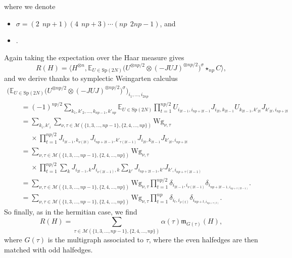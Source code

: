 \documentclass[pdftex]{sigma}
\numberwithin{equation}{section}
\theoremstyle{definition}
\begin{document}
\noindent
where we denote{\samepage
\begin{itemize}\itemsep=0pt
    \item $\sigma = (2 \ \ np+1)(4 \ \ np+3)\cdots (np \ \ 2np-1)$, and
    \item {}.
\end{itemize}}%
Again taking the expectation over the Haar measure gives
\[ R(H) = \big\langle H^{\otimes n}, \mathbb{E}_{U \in \mathrm{Sp}(2N)} \bigl(U^{\otimes np/2} \otimes (-JUJ)^{\otimes np/2}\bigr)^{\sigma} \star_{np} C \big\rangle, \]
and we derive thanks to symplectic Weingarten calculus \cite{collinssniady04}
\begin{gather*}
    \bigl( \mathbb{E}_{U \in \mathrm{Sp}(2N)} \bigl(U^{\otimes np/2} \otimes (-JUJ)^{\otimes np/2}\bigr)^{\sigma}\bigr)_{i_1,\dots,i_{2np}} \\
    \qquad= (-1)^{np/2} \sum_{k_1,k'_2,\dots,k_{np-1},k'_{np}} \mathbb{E}_{U \in \mathrm{Sp}(2N)}\prod_{t=1}^{np/2} U_{i_{2t-1},i_{np+2t-1}} J_{i_{2t},k_{2t-1}} U_{k_{2t-1},k'_{2t}} J_{k'_{2t},i_{np+2t}}\\
    \qquad= \sum_{k_i,k'_i} \sum_{\nu,\tau \in \mathcal{M}(\{1,3,\dots,np-1\}, \{2,4,\dots,np\})} \mathrm{Wg}_{\nu,\tau}\\
     \phantom{\qquad= }{}\times\prod_{t=1}^{np/2} J_{i_{2t-1},k_{\nu(2t)}} J_{i_{np+2t-1},k'_{\tau(2t-1)}} J_{i_{2t},k_{2t-1}} J_{k'_{2t},i_{np+2t}} \\
    \qquad= \sum_{\nu,\tau \in \mathcal{M}(\{1,3,\dots,np-1\}, \{2,4,\dots,np\})} \mathrm{Wg}_{\nu,\tau}\\
     \phantom{\qquad= }{}\times\prod_{t=1}^{np/2} \sum_{k} J_{i_{2t-1},k}  J_{i_{\nu(2t-1)},k} \sum_{k'} J_{i_{np+2t-1},k'} J_{k',i_{np+\tau(2t-1)}} \\
    \qquad= \sum_{\nu,\tau \in \mathcal{M}(\{1,3,\dots,np-1\}, \{2,4,\dots,np\})} \mathrm{Wg}_{\nu,\tau} \prod_{t=1}^{np/2} \delta_{i_{2t-1},i_{\nu(2t-1)}} \delta_{i_{np+2t-1,i_{np+\tau(2t-1)}}}. \\
    \qquad= \sum_{\nu,\tau \in \mathcal{M}(\{1,3,\dots,np-1\}, \{2,4,\dots,np\})} \mathrm{Wg}_{\nu,\tau} \prod_{t=1}^{np} \delta_{i_t,i_{\nu(t)}} \delta_{i_{np+t,i_{np+\tau(t)}}}.
\end{gather*}
So finally, as in the hermitian case, we find
\[R(H) = \sum_{\tau \in \mathcal{M}(\{1,3,\dots,np-1\}, \{2,4,\dots,np\})} \alpha(\tau) \mathfrak{m}_{G(\tau)}(H), \]
where $G(\tau)$ is the multigraph associated to $\tau$, where the even halfedges are then matched with odd halfedges.
\end{document}
